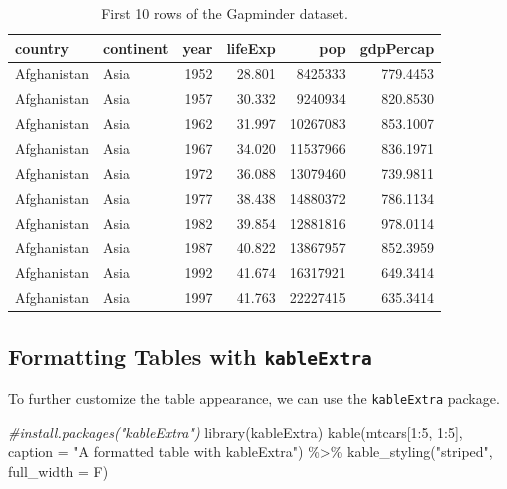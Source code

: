 \documentclass[
]{book}
\newenvironment{Shaded}{\begin{snugshade}}{\end{snugshade}}
\newcommand{\AttributeTok}[1]{\textcolor[rgb]{0.77,0.63,0.00}{#1}}
\newcommand{\CommentTok}[1]{\textcolor[rgb]{0.56,0.35,0.01}{\textit{#1}}}
\newcommand{\DecValTok}[1]{\textcolor[rgb]{0.00,0.00,0.81}{#1}}
\newcommand{\FunctionTok}[1]{\textcolor[rgb]{0.00,0.00,0.00}{#1}}
\newcommand{\NormalTok}[1]{#1}
\newcommand{\SpecialCharTok}[1]{\textcolor[rgb]{0.00,0.00,0.00}{#1}}
\newcommand{\StringTok}[1]{\textcolor[rgb]{0.31,0.60,0.02}{#1}}
\begin{document}
\begin{table}

\caption{\label{tab:unnamed-chunk-2}First 10 rows of the Gapminder dataset.}
\centering
\begin{tabular}[t]{l|l|r|r|r|r}
\hline
country & continent & year & lifeExp & pop & gdpPercap\\
\hline
Afghanistan & Asia & 1952 & 28.801 & 8425333 & 779.4453\\
\hline
Afghanistan & Asia & 1957 & 30.332 & 9240934 & 820.8530\\
\hline
Afghanistan & Asia & 1962 & 31.997 & 10267083 & 853.1007\\
\hline
Afghanistan & Asia & 1967 & 34.020 & 11537966 & 836.1971\\
\hline
Afghanistan & Asia & 1972 & 36.088 & 13079460 & 739.9811\\
\hline
Afghanistan & Asia & 1977 & 38.438 & 14880372 & 786.1134\\
\hline
Afghanistan & Asia & 1982 & 39.854 & 12881816 & 978.0114\\
\hline
Afghanistan & Asia & 1987 & 40.822 & 13867957 & 852.3959\\
\hline
Afghanistan & Asia & 1992 & 41.674 & 16317921 & 649.3414\\
\hline
Afghanistan & Asia & 1997 & 41.763 & 22227415 & 635.3414\\
\hline
\end{tabular}
\end{table}

\hypertarget{formatting-tables-with-kableextra}{%
\subsection{\texorpdfstring{Formatting Tables with \texttt{kableExtra}}{Formatting Tables with kableExtra}}\label{formatting-tables-with-kableextra}}

To further customize the table appearance, we can use the \texttt{kableExtra} package.

\begin{Shaded}
\begin{Highlighting}[]
\CommentTok{\#install.packages("kableExtra") }
\FunctionTok{library}\NormalTok{(kableExtra)}
\FunctionTok{kable}\NormalTok{(mtcars[}\DecValTok{1}\SpecialCharTok{:}\DecValTok{5}\NormalTok{, }\DecValTok{1}\SpecialCharTok{:}\DecValTok{5}\NormalTok{], }\AttributeTok{caption =} \StringTok{"A formatted table with kableExtra"}\NormalTok{) }\SpecialCharTok{\%\textgreater{}\%}
  \FunctionTok{kable\_styling}\NormalTok{(}\StringTok{"striped"}\NormalTok{, }\AttributeTok{full\_width =}\NormalTok{ F)}
\end{Highlighting}
\end{Shaded}
\end{document}
